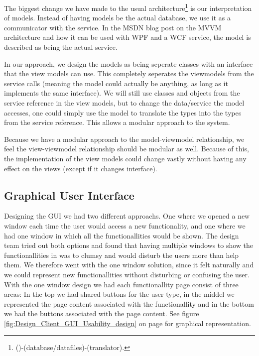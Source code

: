 The biggest change we have made to the usual architecture\footnote{()-(database/datafiles)-(translator).} is our interpretation of models. Instead of having models be the actual database, we use it as a communicator with the service. In the MSDN blog post on the MVVM architecture \cite{MSDN-WPF-MVVM} and how it can be used with WPF and a WCF service, the model is described as being the actual service. 

In our approach, we design the models as being seperate classes with an interface that the view models can use. This completely seperates the viewmodels from the service calls (meaning the model could actually be anything, as long as it implements the same interface). We will still use classes and objects from the service reference in the view models, but to change the data/service the model accesses, one could simply use the model to translate the types into the types from the service reference. This allows a modular approach to the system.

Because we have a modular approach to the model-viewmodel relationship, we feel the view-viewmodel relationship should be modular as well. Because of this, the implementation of the view models could change vastly without having any effect on the views (except if it changes interface).
\subsection{Graphical User Interface}
\label{Design_Client_GUI}
Designing the GUI we had two different approachs. One where we opened a new window each time the user would access a new functionality, and one where we had one window in which all the functionallities would be shown. The design team tried out both options and found that having multiple windows to show the functionallities in was to clumsy and would disturb the users more than help them. We therefore went with the one window solution,  since it felt naturally and we could represent new functionallities without disturbing or confusing the user. With the one window design we had each functionallity page consist of three areas: In the top we had shared buttons for the user type, in the middel we represented the page content associated with the functionallity and in the bottom we had the buttons associated with the page content. See figure \ref{fig:Design_Client_GUI_Usability_design} on page \pageref{fig:Design_Client_GUI_Usability_design} for graphical representation.

